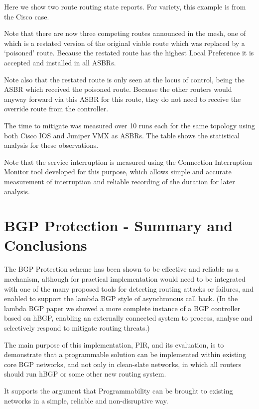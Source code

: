 Here we show two route routing state reports.  For variety, this example is from the Cisco case.

Note that there are now three competing routes announced in the mesh, one of which is a restated version of the original viable route which was replaced by a `poisoned' route.  Because the restated route has the highest Local Preference it is accepted and installed in all ASBRs.

Note also that the restated route is only seen at the locus of control, being the ASBR which received the poisoned route.  Because the other routers would anyway forward via this ASBR for this route, they do not need to receive the override route from the controller.

The time to mitigate was measured over 10 runs each for the same topology using both Cisco IOS and Juniper VMX as ASBRs.  The table shows the statistical analysis for these observations.

Note that the service interruption is measured using the Connection Interruption Monitor tool developed for this purpose, which allows simple and accurate measurement of interruption and reliable recording of the duration for later analysis.

\section{BGP Protection - Summary and Conclusions}

The BGP Protection scheme has been shown to be effective and reliable as a mechanism, although for practical implementation would need to be integrated with one of the many proposed tools for detecting routing attacks or failures, and enabled to support the lambda BGP style of asynchronous call back.  (In the lambda BGP paper\cite{lambdabgp} we showed a more complete instance of a BGP controller based on hBGP, enabling an externally connected system to process, analyse and selectively respond to mitigate routing threats.)

The main purpose of this implementation, PIR,  and its evaluation, is to demonstrate that a programmable solution can be implemented within existing core BGP networks, and not only in clean-slate networks, in which all routers should run hBGP or some other new routing system.

It supports the argument that Programmability can be brought to existing networks in a simple, reliable and non-disruptive way.
